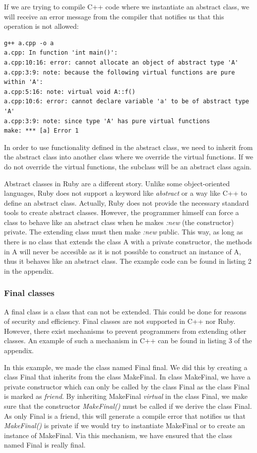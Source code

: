 \documentclass[10pt,a4paper,twocolumn]{article}
\begin{document}
If we are trying to compile C++ code where we instantiate an abstract class, we will receive an error message from the compiler that notifies us that this operation is not allowed:

\begin{lstlisting}
g++ a.cpp -o a
a.cpp: In function 'int main()':
a.cpp:10:16: error: cannot allocate an object of abstract type 'A'
a.cpp:3:9: note: because the following virtual functions are pure within 'A':
a.cpp:5:16: note: virtual void A::f()
a.cpp:10:6: error: cannot declare variable 'a' to be of abstract type 'A'
a.cpp:3:9: note: since type 'A' has pure virtual functions
make: *** [a] Error 1
\end{lstlisting}

In order to use functionality defined in the abstract class, we need to inherit from the abstract class into another class where we override the virtual functions. If we do not override the virtual functions, the subclass will be an abstract class again.

Abstract classes in Ruby are a different story. Unlike some object-oriented languages, Ruby does not support a keyword like \textit{abstract} or a way like C++ to define an abstract class. Actually, Ruby does not provide the necessary standard tools to create abstract classes. However, the programmer himself can force a class to behave like an abstract class when he makes \textit{:new} (the constructor) private. The extending class must then make \textit{:new} public. This way, as long as there is no class that extends the class A with a private constructor, the methods in A will never be accesible as it is not possible to construct an instance of A, thus it behaves like an abstract class. The example code can be found in listing 2 in the appendix.

\subsubsection{Final classes}
A final class is a class that can not be extended. This could be done for reasons of security and efficiency. Final classes are not supported in C++ nor Ruby. However, there exist mechanisms to prevent programmers from extending other classes. An example of such a mechanism in C++ can be found in listing 3 of the appendix.

In this example, we made the class named Final final. We did this by creating a class Final that inherits from the class MakeFinal. In class MakeFinal, we have a private constructor which can only be called by the class Final as the class Final is marked as \textit{friend}. By inheriting MakeFinal \textit{virtual} in the class Final, we make sure that the constructor \textit{MakeFinal()} must be called if we derive the class Final. As only Final is a friend, this will generate a compile error that notifies us that \textit{MakeFinal()} is private if we would try to instantiate MakeFinal or to create an instance of MakeFinal. Via this mechanism, we have ensured that the class named Final is really final. 
\end{document}
